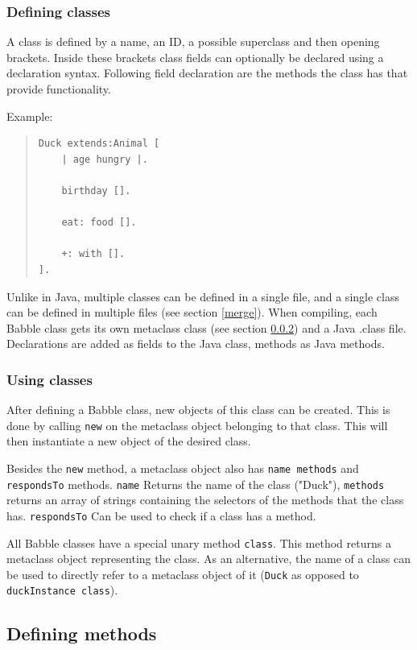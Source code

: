 \documentclass[a4paper]{article}
\begin{document}
\subsubsection{Defining classes}
A class is defined by a name, an ID, a possible superclass and then opening brackets. Inside these brackets class fields can optionally be declared using a declaration syntax. Following field declaration are the methods the class has that provide functionality.

Example:
\begin{quote}
\begin{lstlisting}
Duck extends:Animal [
	| age hungry |.
	
	birthday [].
	
	eat: food [].
	
	+: with [].
].
\end{lstlisting}
\end{quote}

Unlike in Java, multiple classes can be defined in a single file, and a single class can be defined in multiple files (see section \ref{merge}). When compiling, each Babble class gets its own metaclass class (see section \ref{metaclass}) and a Java .class file. Declarations are added as fields to the Java class, methods as Java methods.

\subsubsection{Using classes}
\label{metaclass}
After defining a Babble class, new objects of this class can be created. This is done by calling \texttt{new} on the metaclass object belonging to that class. This will then instantiate a new object of the desired class.

Besides the \texttt{new} method, a metaclass object also has \texttt{name methods} and \texttt{respondsTo} methods. \texttt{name} Returns the name of the class ("Duck"), \texttt{methods} returns an array of strings containing the selectors of the methods that the class has. \texttt{respondsTo} Can be used to check if a class has a method.

All Babble classes have a special unary method \texttt{class}. This method returns a metaclass object representing the class. As an alternative, the name of a class can be used to directly refer to a metaclass object of it (\texttt{Duck} as opposed to \texttt{duckInstance class}).


\subsection{Defining methods}
\end{document}
